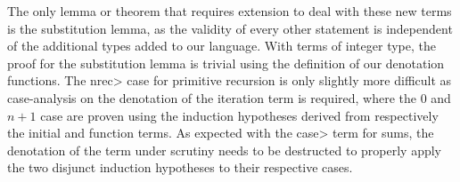  The only lemma or theorem that requires extension to deal with these new terms is the substitution lemma, as the validity of every other statement is independent of the additional types added to our language.
  With terms of integer type, the proof for the substitution lemma is trivial using the definition of our denotation functions.
  The \<nrec> case for primitive recursion is only slightly more difficult as case-analysis on the denotation of the iteration term is required, where the $0$ and $n+1$ case are proven using the induction hypotheses derived from respectively the initial and function terms.
  As expected with the \<case> term for sums, the denotation of the term under scrutiny needs to be destructed to properly apply the two disjunct induction hypotheses to their respective cases.
